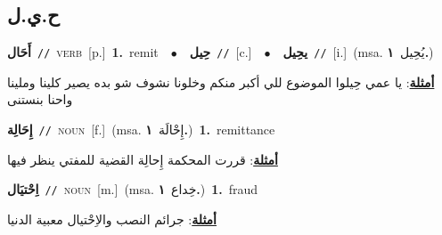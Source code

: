 \documentclass[10pt,a4paper,twoside]{article} %
\begin{document}
\begin{multicols}{2}
\vspace{-3mm}
\subsection*{\color{blue}\foreignlanguage{arabic}{ح.ي.ل}\color{blue}{}} 

{\setlength\topsep{0pt}\textbf{\foreignlanguage{arabic}{أَحَال}}\ {\color{gray}\texttt{//}\color{black}}\ \textsc{verb}\ [p.]\ \textbf{1.}~remit\ \ $\bullet$\ \ \setlength\topsep{0pt}\textbf{\foreignlanguage{arabic}{حِيل}}\ {\color{gray}\texttt{//}\color{black}}\ [c.]\ \ $\bullet$\ \ \setlength\topsep{0pt}\textbf{\foreignlanguage{arabic}{يحِيل}}\ {\color{gray}\texttt{//}\color{black}}\ [i.]\ \color{gray}(msa. \foreignlanguage{arabic}{يُحِيل}~\foreignlanguage{arabic}{\textbf{١.}})\color{black}\  \begin{flushright}\color{gray}\foreignlanguage{arabic}{\textbf{\underline{\foreignlanguage{arabic}{أمثلة}}}: يا عمي حِيلوا الموضوع للي أكبر منكم وخلونا نشوف شو بده يصير كلينا وملينا واحنا بنستنى}\end{flushright}\color{black}} \vspace{2mm}

{\setlength\topsep{0pt}\textbf{\foreignlanguage{arabic}{إِحَالِة}}\ {\color{gray}\texttt{//}\color{black}}\ \textsc{noun}\ [f.]\ \color{gray}(msa. \foreignlanguage{arabic}{إِحْالَة}~\foreignlanguage{arabic}{\textbf{١.}})\color{black}\ \textbf{1.}~remittance\  \begin{flushright}\color{gray}\foreignlanguage{arabic}{\textbf{\underline{\foreignlanguage{arabic}{أمثلة}}}: قررت المحكمة إِحالِة القضية للمفتي ينظر فيها}\end{flushright}\color{black}} \vspace{2mm}

{\setlength\topsep{0pt}\textbf{\foreignlanguage{arabic}{اِحْتيَال}}\ {\color{gray}\texttt{//}\color{black}}\ \textsc{noun}\ [m.]\ \color{gray}(msa. \foreignlanguage{arabic}{خِداع}~\foreignlanguage{arabic}{\textbf{١.}})\color{black}\ \textbf{1.}~fraud\  \begin{flushright}\color{gray}\foreignlanguage{arabic}{\textbf{\underline{\foreignlanguage{arabic}{أمثلة}}}: جرائم النصب والاِحْتيال معبية الدنيا}\end{flushright}\color{black}} \vspace{2mm}


\end{multicols}
\end{document}

